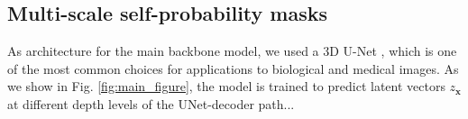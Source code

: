 \subsection{Multi-scale self-probability masks}\label{sec:multiscale_patches}
As architecture for the main backbone model, we used a 3D U-Net \cite{ronneberger2015u, cciccek20163d}, which is one of the most common choices for applications to biological and medical images.
As we show in Fig. \ref{fig:main_figure}, the model is trained to predict latent vectors $z_{\mathbf{x}}$ at different depth levels of the UNet-decoder path...


